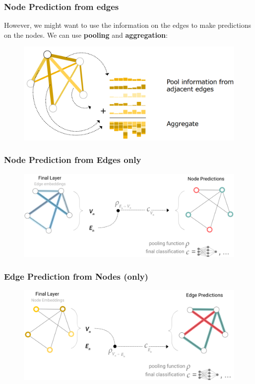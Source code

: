 \subsubsection*{Node Prediction from edges}
However, we might want to use the information on the edges to make predictions on the nodes.
We can use \textbf{pooling} and \textbf{aggregation}:
\begin{figure}[!h]
    \includegraphics[width = 0.7\columnwidth]{figures/GraphNeuralNetworks1/PredictionFromEdges.png}
\end{figure}

\subsubsection*{Node Prediction from Edges only}
\begin{figure}[!h]
    \includegraphics[width = \columnwidth]{figures/GraphNeuralNetworks1/NodePredictionFromEdgesOnly.png}
\end{figure}

\subsubsection*{Edge Prediction from Nodes (only)}
\begin{figure}[!h]
    \includegraphics[width = \columnwidth]{figures/GraphNeuralNetworks1/EdgePredictionsFromNodes.png}
\end{figure}

